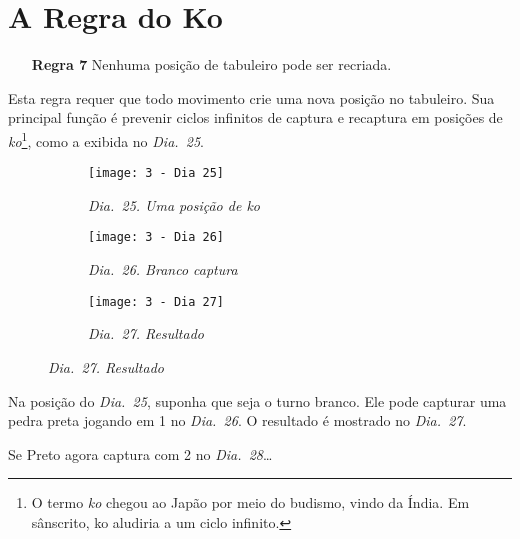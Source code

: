 \chapter{A Regra do Ko}

\begin{itemize}
  \item[\textbf{Regra 7}] Nenhuma posição de tabuleiro pode ser recriada.
\end{itemize}

Esta regra requer que todo movimento crie uma nova posição no tabuleiro. Sua principal função é prevenir ciclos infinitos de captura e recaptura em posições de \emph{ko}\footnote{O termo \emph{ko} chegou ao Japão por meio do budismo, vindo da Índia. Em sânscrito, ko aludiria a um ciclo infinito.}, como a exibida no \emph{Dia.\@~25}.

\begin{figure}[h]
  \centering
  \begin{subfigure}[t]{.3\textwidth}
      \centering
      \texttt{[image: 3 - Dia 25]}
      \caption*{\emph{Dia.\@~25. Uma posição de ko}}
  \end{subfigure}
  \hfill
  \begin{subfigure}[t]{.3\textwidth}
      \centering
      \texttt{[image: 3 - Dia 26]}
      \caption*{\emph{Dia.\@~26. Branco captura}}
  \end{subfigure}
  \hfill
  \begin{subfigure}[t]{.3\textwidth}
      \centering
      \texttt{[image: 3 - Dia 27]}
      \caption*{\emph{Dia.\@~27. Resultado}}
  \end{subfigure}
\end{figure}

Na posição do \emph{Dia.\@~25}, suponha que seja o turno branco. Ele pode capturar uma pedra preta jogando em 1 no \emph{Dia.\@~26}. O resultado é mostrado no \emph{Dia.\@~27}.

Se Preto agora captura com 2 no \emph{Dia.\@~28}\ldots

\pagebreak

